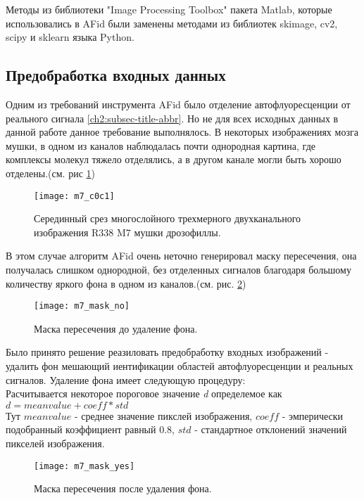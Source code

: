 Методы из библиотеки "Image Processing Toolbox" пакета Matlab, которые использовались в AFid  были заменены методами из библиотек skimage, cv2, scipy и sklearn языка Python.


\subsection{Предобработка входных данных}
Одним из требований инструмента AFid было отделение автофлуоресценции от реального сигнала \ref{ch2:subsec-title-abbr}. Но не для всех исходных данных в данной работе данное требование выполнялось. В некоторых изображениях мозга мушки, в одном из каналов наблюдалась почти однородная картина, где комплексы молекул тяжело отделялись, а в другом канале могли быть хорошо отделены.(см. рис \ref{m7_c0c1})
\begin{figure}[H]
	\centering
	\texttt{[image: m7\_c0c1]}
	\caption{Серединный срез многослойного трехмерного двухканального изображения R338 M7 мушки дрозофиллы.}
	\label{m7_c0c1}
\end{figure}



В этом случае алгоритм AFid очень неточно генерировал маску пересечения, она получалась слишком однородной, без отделенных сигналов благодаря большому количеству яркого фона в одном из каналов.(см. рис. \ref{m7_mask_no})

\begin{figure}[H]
	\centering
	\texttt{[image: m7\_mask\_no]}
	\caption{Маска пересечения до удаление фона.}
	\label{m7_mask_no}
\end{figure}

Было принято решение реазиловать предобработку входных изображений - удалить фон мешающий иентификации областей автофлуоресценции и реальных сигналов.
Удаление фона имеет следующую процедуру:\\
Расчитывается некоторое пороговое значение \textit{d} определемое как\\ $ d = mean value + coeff * std$\\
Тут $ mean value $ -  среднее значение пикслей изображения, $ coeff $ - эмперически подобранный коэффициент равный 0.8, $ std $ - стандартное отклонений значений пикселей изображения.

\begin{figure}[H]
	\centering
	\texttt{[image: m7\_mask\_yes]}
	\caption{Маска пересечения после удаления фона.}
	\label{m7_mask_yes}
\end{figure}

